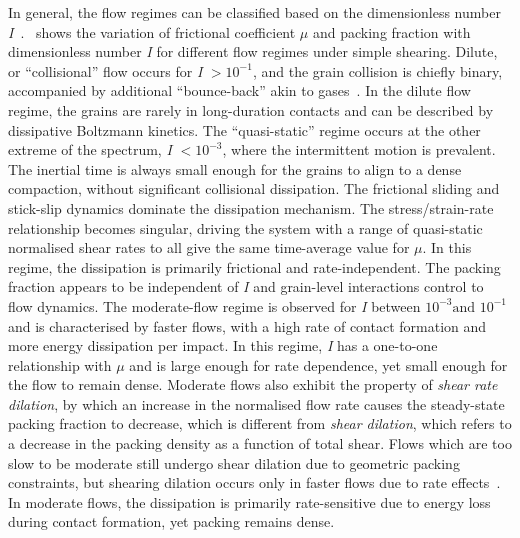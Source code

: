 In general, the flow regimes can be classified based on the dimensionless 
number \textit{I}~\citep{DaCruz2005}.~ shows the variation of 
frictional coefficient $\mu$ and packing fraction with dimensionless 
number \textit{I} for different flow regimes under simple shearing. Dilute, or 
``collisional'' flow occurs for \textit{I} $>10^{-1}$, and the grain collision 
is chiefly binary, accompanied  by additional ``bounce-back'' akin to 
gases~\citep{Kamrin2008}. In the dilute flow regime, the grains are rarely in 
long-duration contacts and can be described by dissipative Boltzmann kinetics. 
The ``quasi-static'' regime occurs at the other extreme of the spectrum, 
\textit{I} $<10^{-3}$, where the intermittent motion is prevalent. The inertial 
time is always small enough for the grains to align to a dense compaction, 
without significant collisional dissipation. The frictional sliding and 
stick-slip dynamics dominate the dissipation mechanism. The stress/strain-rate 
relationship becomes singular, driving the system with a range of quasi-static 
normalised shear rates to all give the same time-average value for $\mu$. In 
this regime, the dissipation is primarily frictional and rate-independent. The 
packing fraction appears to be independent of \textit{I} and grain-level 
interactions control to flow dynamics. The moderate-flow regime is observed for 
\textit{I} between $10^{-3} \mbox{and }10^{-1}$ and is characterised by faster 
flows, with a high rate of contact formation and more energy dissipation per 
impact. 
In this regime, \textit{I} has a one-to-one relationship with $\mu$ and is 
large 
enough for rate dependence, yet small enough for the flow to remain dense. 
Moderate flows also exhibit the property of \textit{shear rate dilation}, 
by which an increase in the normalised flow rate causes the steady-state 
packing fraction to decrease, which is different from \textit{shear dilation}, 
which refers to a decrease in the packing density as a function of total shear. 
Flows which are too slow to be moderate still undergo shear dilation due to 
geometric packing constraints, but shearing dilation occurs only in faster 
flows due to rate effects~\citep{Kamrin2008}. In moderate flows, the 
dissipation is primarily rate-sensitive due to energy loss during contact 
formation, yet packing remains dense.

